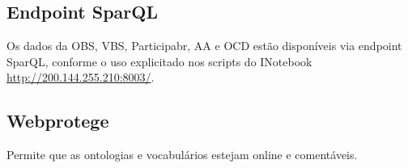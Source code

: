 \documentclass[12pt]{article}
\begin{document}
\subsection{Endpoint SparQL}

Os dados da OBS, VBS, Participabr, AA e OCD estão disponíveis via endpoint SparQL, conforme o uso explicitado nos scripts do INotebook \url{http://200.144.255.210:8003/}.

\subsection{Webprotege}

Permite que as ontologias e vocabulários estejam online e comentáveis.


\end{document}
